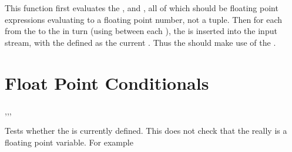 \documentclass[oneside]{book}
\begin{document}
\begin{function}{\fpStepVariable}
\begin{syntax}
     
\end{syntax}
This function first evaluates the , 
and , all of which should be floating point
expressions evaluating to a floating point number, not a tuple.
Then for each  from the  to the
 in turn (using  between each
), the  is inserted into the input stream,
with the  defined as the current .  Thus
the  should make use of the .
\end{function}

\section{Float Point Conditionals}

\begin{function}{\fpIfExist,\fpIfExistT,\fpIfExistF,\fpIfExistTF}
\begin{syntax}
 
  
  
   
\end{syntax}
Tests whether the  is currently defined.  This does not
check that the  really is a floating point variable.
For example
\begin{demohigh}
\fpIfExistTF {} {}
\fpIfExistTF {} {}
\end{demohigh}
\end{function}
\end{document}
